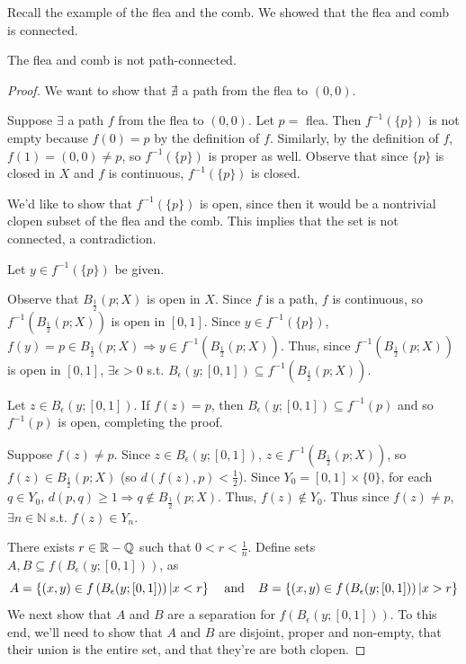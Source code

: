 Recall the example of the flea and the comb. We showed that the flea and comb is connected. 
\begin{theorem}
The flea and comb is not path-connected. 
\end{theorem}
\begin{proof}
We want to show that $\nexists$ a path from the flea to $(0,0)$. 

Suppose $\exists$ a path $f$ from the flea to $(0,0)$. Let $p =$ flea. Then $f^{-1}(\{p\})$ is not empty because $f(0) = p$ by the definition of $f$. Similarly, by the definition of $f$, $f(1) = (0,0) \neq p$, so $f^{-1}(\{p\})$ is proper as well. Observe that since $\{p\}$ is closed in $X$ and $f$ is continuous, $f^{-1}(\{p\})$ is closed.

We'd like to show that $f^{-1}(\{p\})$ is open, since then it would be a nontrivial clopen subset of the flea and the comb. This implies that the set is not connected, a contradiction.

Let $y \in f^{-1}(\{p\})$ be given. 

Observe that $B_{\frac{1}{2}}(p; X)$ is open in $X$. Since $f$ is a path, $f$ is continuous, so $f^{-1}(B_{\frac{1}{2}}(p; X))$ is open in $[0,1]$. Since $y \in f^{-1}(\{p\})$, $f(y) = p \in B_{\frac{1}{2}}(p; X) \Rightarrow y \in f^{-1}(B_{\frac{1}{2}}(p; X))$. Thus, since $f^{-1}(B_{\frac{1}{2}}(p; X))$ is open in $[0,1]$, $\exists \epsilon > 0$ s.t. $B_{\epsilon}(y; [0,1]) \subseteq f^{-1}(B_{\frac{1}{2}}(p; X))$.

Let $z \in B_{\epsilon}(y; [0,1])$. If $f(z) = p$, then $B_{\epsilon}(y; [0,1]) \subseteq f^{-1}(p)$ and so $f^{-1}(p)$ is open, completing the proof.

Suppose $f(z) \neq p$. Since $z \in B_{\epsilon}(y; [0,1])$, $z \in f^{-1}(B_{\frac{1}{2}}(p; X))$, so $f(z) \in B_{\frac{1}{2}}(p; X)$ (so $d(f(z), p) < \frac{1}{2}$). Since $Y_0 = [0,1] \times \{0\}$, for each $q \in Y_0$, $d(p,q) \geq 1 \Rightarrow q \not\in B_{\frac{1}{2}}(p; X)$. Thus, $f(z) \not\in Y_0$. Thus since $f(z) \neq p$, $\exists n \in \mathbb{N}$ s.t. $f(z) \in Y_n$.

There exists $r\in \mathbb R-\mathbb Q$ such that $0 < r < \frac{1}{n}$. Define sets $A, B\subseteq f\left( B_{\epsilon} (y;[0,1]) \right)$, as
\[A = \left\{ (x,y)\in f\left( B_{\epsilon} (y;[0,1]) \right) | x< r\right\} \hspace{.15in} \text{and} \hspace{.15in} B = \left\{ (x,y)\in f\left( B_{\epsilon} (y;[0,1]) \right) | x> r\right\}\]
We next show that $A$ and $B$ are a separation for $f\left( B_{\epsilon} (y;[0,1]) \right)$. To this end, we'll need to show that $A$ and $B$ are disjoint, proper and non-empty, that their union is the entire set, and that they're are both clopen.


\end{proof}

